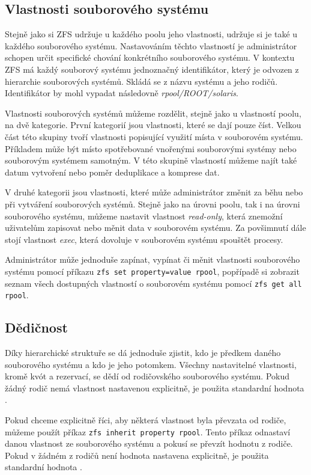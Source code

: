 \subsection{Vlastnosti souborového systému}
Stejně jako si ZFS udržuje u každého poolu jeho vlastnosti, udržuje si je také u každého souborového systému. Nastavováním těchto vlastností je administrátor schopen určit specifické chování konkrétního souborového systému. V kontextu ZFS má každý souborový systému jednoznačný identifikátor, který je odvozen z hierarchie souborových systémů. Skládá se z názvu systému a jeho rodičů. Identifikátor by mohl vypadat následovně \emph{rpool/ROOT/solaris}.

Vlastnosti souborových systémů můžeme rozdělit, stejně jako u vlastností poolu, na dvě kategorie. První kategorií jsou vlastnosti, které se dají pouze číst. Velkou část této skupiny tvoří vlastnosti popisující využití místa v souborovém systému. Příkladem může být místo spotřebované vnořenými souborovými systémy nebo souborovým systémem samotným. V této skupině vlastností můžeme najít také datum vytvoření nebo poměr deduplikace a komprese dat.

V druhé kategorii jsou vlastnosti, které může administrátor změnit za běhu nebo při vytváření souborových systémů. Stejně jako na úrovni poolu, tak i na úrovni souborového systému, můžeme nastavit vlastnost \emph{read-only}, která znemožní uživatelům zapisovat nebo měnit data v souborovém systému. Za povšimnutí dále stojí vlastnost \emph{exec}, která dovoluje v souborovém systému spouštět procesy.

Administrátor může jednoduše zapínat, vypínat či měnit vlastnosti souborového systému pomocí příkazu \verb|zfs set property=value rpool|, popřípadě si zobrazit seznam všech dostupných vlastností o souborovém systému pomocí \verb|zfs get all rpool|.

\subsection{Dědičnost}
Díky hierarchické struktuře se dá jednoduše zjistit, kdo je předkem daného souborového systému a kdo je jeho potomkem. Všechny nastavitelné vlastnosti, kromě kvót a rezervací, se dědí od rodičovského souborového systému. Pokud žádný rodič nemá vlastnost nastavenou explicitně, je použita standardní hodnota \cite{inheriting}.

Pokud chceme explicitně říci, aby některá vlastnost byla převzata od rodiče, můžeme použít příkaz \verb|zfs inherit property rpool|. Tento příkaz odnastaví danou vlastnost ze souborového systému a pokusí se převzít hodnotu z rodiče. Pokud v žádném z rodičů není hodnota nastavena explicitně, je použita standardní hodnota \cite{inheriting}.
